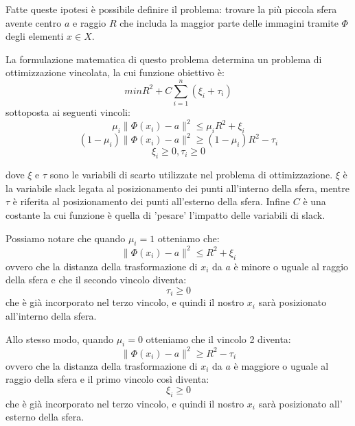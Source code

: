 \documentclass[a4paper,12pt]{report}
\begin{document}
Fatte queste ipotesi è possibile definire il problema: trovare la più piccola sfera avente centro $a$ e raggio $R$ che includa la maggior parte delle immagini tramite $\Phi$ degli elementi $x\in X$.



La formulazione matematica di questo problema determina un problema di ottimizzazione vincolata, la cui funzione obiettivo è:
\begin{equation*}
    min R^2 + C\displaystyle\sum_{i=1}^{n}(\xi_i+\tau_i)
\end{equation*}
sottoposta ai seguenti vincoli:
\begin{equation}
    \mu_i\|\Phi(x_i)-a\|^2\le\mu_iR^2 + \xi_i
\end{equation}
\begin{equation}
    (1-\mu_i)\|\Phi(x_i)-a\|^2 \ge (1-\mu_i)R^2 - \tau_i
\end{equation}
\begin{equation}
    \xi_i \ge 0, \tau_i \ge 0
\end{equation}


dove $\xi$ e $\tau$ sono le variabili di scarto utilizzate nel problema di ottimizzazione. $\xi$ è la variabile slack legata al posizionamento dei punti all'interno della sfera, mentre $\tau$ è riferita al posizionamento dei punti all'esterno della sfera. Infine $C$ è una costante la cui funzione è quella di 'pesare' l'impatto delle variabili di slack.

Possiamo notare che quando $\mu_i = 1$ otteniamo che:
\begin{equation*}
    \|\Phi(x_i)-a\|^{2} \le R^2 + \xi_i
\end{equation*}
ovvero che la distanza della trasformazione di $x_i$ da $a$ è minore o uguale al raggio della sfera e che il secondo vincolo diventa:
\begin{equation*}
    \tau_i \ge 0
\end{equation*}
che è già incorporato nel terzo vincolo, e quindi il nostro $x_i$ sarà posizionato all'interno della sfera.

Allo stesso modo, quando $\mu_i = 0$ otteniamo che il vincolo 2 diventa:
\begin{equation*}
    \|\Phi(x_i)-a\|^2 \ge R^2 - \tau_i
\end{equation*}
ovvero che la distanza della trasformazione di $x_i$ da $a$ è maggiore o uguale al raggio della sfera e il primo vincolo così diventa:
\begin{equation*}
    \xi_i \ge 0
\end{equation*}
che è già incorporato nel terzo vincolo, e quindi il nostro $x_i$ sarà posizionato all' esterno della sfera.
\end{document}
